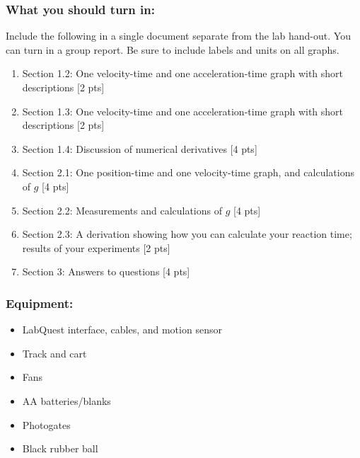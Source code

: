 \documentclass[11pt,letterpaper]{article}
\newcounter{question}[section]
\begin{document}
\subsubsection*{What you should turn in:}
Include the following in a single document separate from the lab hand-out. You can turn in a group report. Be sure to include labels and units on all graphs. 
\begin{enumerate}
\setlength{\parskip}{3pt}
\item Section 1.2: One velocity-time and one acceleration-time graph with short descriptions [2 pts]
\item Section 1.3: One velocity-time and one acceleration-time graph with short descriptions [2 pts]
\item Section 1.4: Discussion of numerical derivatives [4 pts]
\item Section 2.1: One position-time and one velocity-time graph, and calculations of $g$ [4 pts]
\item Section 2.2: Measurements and calculations of $g$ [4 pts]
\item Section 2.3: A derivation showing how you can calculate your reaction time; results of your experiments [2 pts]
\item Section 3: Answers to questions [4 pts]
\end{enumerate}

\subsubsection*{Equipment:}
\begin{itemize}
\setlength{\parskip}{3pt}
\item LabQuest interface, cables, and motion sensor
\item Track and cart
\item Fans
\item AA batteries/blanks
\item Photogates
\item Black rubber ball
\end{itemize}
\end{document}
